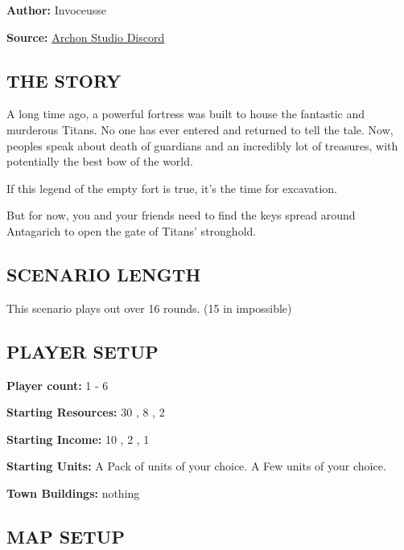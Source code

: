 
\begin{multicols*}{2}

\textbf{Author:} Invoceusse

\textbf{Source:} \href{https://discord.com/channels/740870068178649108/1219333721019256943}{Archon Studio Discord}

\subsection*{\MakeUppercase{The story}}

A long time ago, a powerful fortress was built to house the fantastic and murderous Titans. No one has ever entered and returned to tell the tale. Now, peoples speak about death of guardians and an incredibly lot of treasures, with potentially the best bow of the world. 

If this legend of the empty fort is true, it's the time for excavation.

But for now, you and your friends need to find the keys spread around Antagarich to open the gate of Titans' stronghold. 

\subsection*{\MakeUppercase{Scenario length}}

This scenario plays out over 16 rounds. (15 in impossible)

\subsection*{\MakeUppercase{Player setup}}

\textbf{Player count:} 1 - 6

\textbf{Starting Resources:} 30 , 8 , 2 

\textbf{Starting Income:} 10 , 2 , 1 

\textbf{Starting Units:} 
    A Pack of  units of your choice.
    A Few  units of your choice.

\textbf{Town Buildings:} nothing

\subsection*{\MakeUppercase{Map setup}}


\end{multicols*}
